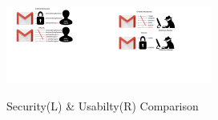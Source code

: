 




\begin{figure}[htb]
	\begin{center}
		\includegraphics[height=1in,width=0.48\linewidth]{Figures/Introduction/Usability.pdf}\includegraphics[height=1in,width=0.48\linewidth]{Figures/Introduction/Security.pdf}		\caption{Security(L) \& Usabilty(R) Comparison}\label{figure:introduction_security}
	\end{center}
	\vspace{-0.8cm}
\end{figure}








